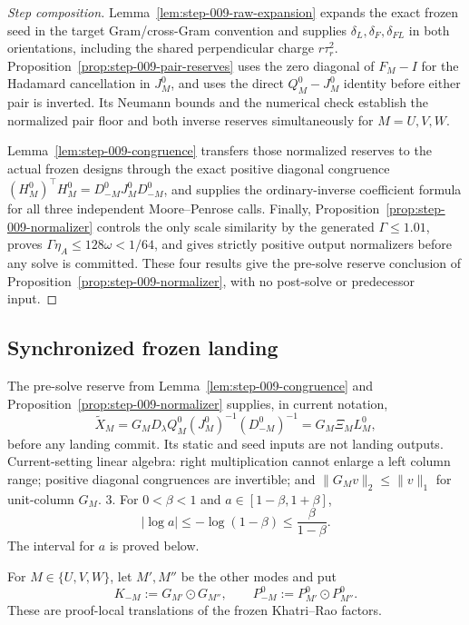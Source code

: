 \begin{proof}[Step composition]
Lemma~\ref{lem:step-009-raw-expansion} expands the exact frozen seed in the
target Gram/cross-Gram convention and supplies \(\delta_L,\delta_F,\delta_{FL}\)
in both orientations, including the shared perpendicular charge
\(r\tau_r^2\). Proposition~\ref{prop:step-009-pair-reserves} uses the zero
diagonal of \(F_M-I\) for the Hadamard cancellation in \(J_M^0\), and uses
the direct \(Q_M^0-J_M^0\) identity before either pair is inverted. Its
Neumann bounds and the numerical check establish the normalized pair floor
and both inverse reserves simultaneously for \(M=U,V,W\).

Lemma~\ref{lem:step-009-congruence} transfers those normalized reserves to the
actual frozen designs through the exact positive diagonal congruence
\((H_M^0)^\top H_M^0=D_{-M}^0J_M^0D_{-M}^0\), and supplies the
ordinary-inverse coefficient formula for all three independent Moore--Penrose
calls. Finally, Proposition~\ref{prop:step-009-normalizer} controls the only
scale similarity by the generated \(\Gamma\le1.01\), proves
\(\Gamma\eta_A\le128\omega<1/64\), and gives strictly positive output
normalizers before any solve is committed. These four results give the
pre-solve reserve conclusion of Proposition~\ref{prop:step-009-normalizer},
with no post-solve or predecessor input.
\end{proof}

\subsection{Synchronized frozen landing}\label{app:step-010}

The pre-solve reserve from Lemma~\ref{lem:step-009-congruence} and
Proposition~\ref{prop:step-009-normalizer} supplies, in current notation,
   \[
   \widetilde X_M
   =G_MD_\lambda Q_M^0(J_M^0)^{-1}(D_{-M}^0)^{-1}
   =G_M\Xi_ML_M^0, \tag{C1}
   \]
   before any landing commit. Its static and seed inputs are not landing outputs.
Current-setting linear algebra: right multiplication cannot enlarge a
   left column range; positive diagonal congruences are invertible; and
   \(\|G_Mv\|_2\le\|v\|_1\) for unit-column \(G_M\).
3. For \(0<\beta<1\) and \(a\in[1-\beta,1+\beta]\),
   \[
   |\log a|\le-\log(1-\beta)\le\frac{\beta}{1-\beta}. \tag{C2}
   \]
   The interval for \(a\) is proved below.

For \(M\in\{U,V,W\}\), let \(M',M''\) be the other modes and put
\[
K_{-M}:=G_{M'}\odot G_{M''},\qquad
P_{-M}^0:=P_{M'}^0\odot P_{M''}^0.
\]
These are proof-local translations of the frozen Khatri--Rao factors.


